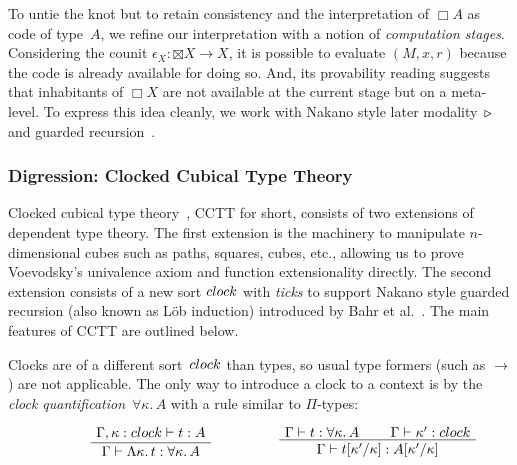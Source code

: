 \documentclass[a4paper,UKenglish,numberwithinsect,cleveref,thm-restate]{lipics-v2021}
\numberwithin{equation}{section}
\theoremstyle{plain}
\begin{document}
To untie the knot but to retain consistency and the interpretation of $\Box A$ as code of type~$A$, we refine our interpretation with a notion of \emph{computation stages}. 
Considering the counit $\epsilon_X\colon \boxtimes X \to X$, it is possible to evaluate $(M, x, r)$ because the code is already available for doing so.
And, its provability reading suggests that inhabitants of $\Box X$ are not available at the current stage but on a meta-level.
To express this idea cleanly, we work with Nakano style later modality~$\mathord{\triangleright}$ and guarded recursion~\cite{Nakano2000}.

\subsubsection{Digression: Clocked Cubical Type Theory}
Clocked cubical type theory~\cite{Kristensen2021}, CCTT for short, consists of two extensions of dependent type theory.
The first extension is the machinery to manipulate $n$-dimensional cubes such as paths, squares, cubes, etc., allowing us to prove Voevodsky’s univalence axiom and function extensionality directly.
The second extension consists of a new sort $\clock$ with \emph{ticks} to support Nakano style guarded recursion (also known as Löb induction) introduced by Bahr et al.~\cite{Bahr2017}.
The main features of CCTT are outlined below.

Clocks are of a different sort~$\clock$ than types, so usual type formers (such as $\to$) are not applicable.
The only way to introduce a clock to a context is by the \emph{clock quantification}~$\forall \kappa.\, A$ with a rule similar to $\Pi$-types:
\[
  \begin{minipage}{0.47\linewidth}
    \begin{prooftree}
      \AxiomC{$\Gamma, \kappa : \clock \vdash t : A$}
      \UnaryInfC{$\Gamma \vdash \Lambda \kappa.\, t : \forall \kappa.\, A $}
    \end{prooftree}
  \end{minipage}
  \begin{minipage}{0.47\linewidth}
    \begin{prooftree}
      \AxiomC{$\Gamma \vdash t : \forall \kappa.\, A$}
      \AxiomC{$\Gamma \vdash \kappa' : \clock $}
      \BinaryInfC{$\Gamma \vdash t[\kappa'/\kappa] : A[\kappa'/\kappa]$}
    \end{prooftree}
  \end{minipage}
\]
\end{document}
